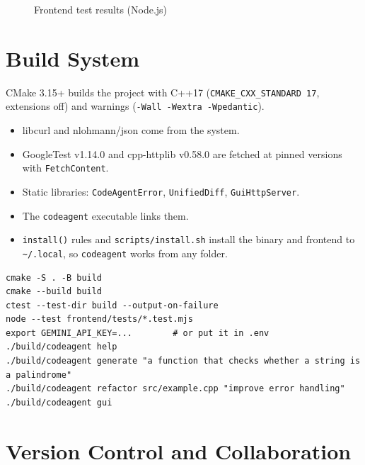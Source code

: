 \documentclass[12pt,a4paper,oneside]{book}
\begin{document}
\begin{figure}[htbp]
\centering
{}
\caption{Frontend test results (Node.js)}
\label{fig:ca-node}
\end{figure}

\section{Build System}

CMake 3.15+ builds the project with C++17 (\texttt{CMAKE\_CXX\_STANDARD 17},
extensions off) and warnings (\texttt{-Wall -Wextra -Wpedantic}).
\begin{itemize}
  \item libcurl and nlohmann/json come from the system.
  \item GoogleTest v1.14.0 and cpp-httplib v0.58.0 are fetched at pinned
    versions with \texttt{FetchContent}.
  \item Static libraries: \texttt{CodeAgentError}, \texttt{UnifiedDiff},
    \texttt{GuiHttpServer}.
  \item The \texttt{codeagent} executable links them.
  \item \texttt{install()} rules and \texttt{scripts/\allowbreak{}install.sh} install the
    binary and frontend to \texttt{\textasciitilde/\allowbreak{}.local}, so
    \texttt{codeagent} works from any folder.
\end{itemize}

\begin{lstlisting}[style=codeagentplain,caption={Build, test and run},label={lst:ca-build}]
cmake -S . -B build
cmake --build build
ctest --test-dir build --output-on-failure
node --test frontend/tests/*.test.mjs
export GEMINI_API_KEY=...        # or put it in .env
./build/codeagent help
./build/codeagent generate "a function that checks whether a string is a palindrome"
./build/codeagent refactor src/example.cpp "improve error handling"
./build/codeagent gui
\end{lstlisting}

\section{Version Control and Collaboration}
\label{sec:ca-git}
\end{document}
